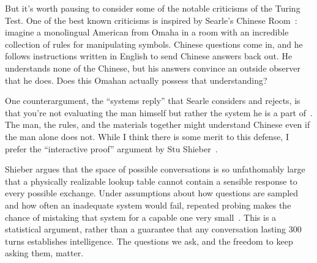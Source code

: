 But it's worth pausing to consider some of the notable criticisms of
the Turing Test.
%
One of the best known criticisms is inspired by Searle's Chinese
Room~\citep{searle-80}: imagine a monolingual American from Omaha
in a room with an incredible collection of rules for manipulating symbols.
%
Chinese questions come in, and he follows instructions written in
English to send Chinese answers back out.
%
He understands none of the Chinese, but his answers convince an outside
observer that he does.  Does this Omahan actually possess that understanding?

One counterargument, the ``systems reply'' that Searle considers and
rejects, is that you're not evaluating the man himself but rather the
system he is a part of~\citep[pp.~419--420]{searle-80}.
%
The man, the rules, and the materials together might understand Chinese
even if the man alone does not.
%
While I think there is some merit to this defense, I prefer the
``interactive proof'' argument by Stu Shieber~\citep{shieber-07}.

Shieber argues that the space of possible conversations is so
unfathomably large that a physically realizable lookup table cannot
contain a sensible response to every possible exchange.
%
Under assumptions about how questions are sampled and how often an
inadequate system would fail, repeated probing makes the chance of
mistaking that system for a capable one very small~\citep[Section~5]{shieber-07}.
%
This is a statistical argument, rather than a guarantee that any
conversation lasting 300 turns establishes intelligence.
%
The questions we ask, and the freedom to keep asking them, matter.

